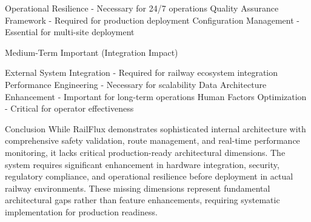 Operational Resilience - Necessary for 24/7 operations
Quality Assurance Framework - Required for production deployment
Configuration Management - Essential for multi-site deployment

Medium-Term Important (Integration Impact)

External System Integration - Required for railway ecosystem integration
Performance Engineering - Necessary for scalability
Data Architecture Enhancement - Important for long-term operations
Human Factors Optimization - Critical for operator effectiveness

Conclusion
While RailFlux demonstrates sophisticated internal architecture with comprehensive safety validation, route management, and real-time performance monitoring, it lacks critical production-ready architectural dimensions. The system requires significant enhancement in hardware integration, security, regulatory compliance, and operational resilience before deployment in actual railway environments. These missing dimensions represent fundamental architectural gaps rather than feature enhancements, requiring systematic implementation for production readiness.